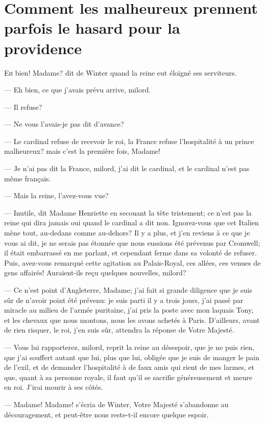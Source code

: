 \chapter[Les malheureux prennent le hasard pour la providence]{Comment les malheureux prennent parfois le hasard pour la providence}

\lettrine[ante=—]{E}{h} bien! Madame? dit de Winter quand la reine eut éloigné ses serviteurs.

\zz
— Eh bien, ce que j'avais prévu arrive, milord.

\zz
— Il refuse?

\zz
— Ne vous l'avais-je pas dit d'avance?

— Le cardinal refuse de recevoir le roi, la France refuse l'hospitalité à un prince malheureux? mais c'est la première fois, Madame!

— Je n'ai pas dit la France, milord, j'ai dit le cardinal, et le cardinal n'est pas même français.

— Mais la reine, l'avez-vous vue?

— Inutile, dit Madame Henriette en secouant la tête tristement; ce n'est pas la reine qui dira jamais oui quand le cardinal a dit non. Ignorez-vous que cet Italien mène tout, au-dedans comme au-dehors? Il y a plus, et j'en reviens à ce que je vous ai dit, je ne serais pas étonnée que nous eussions été prévenus par Cromwell; il était embarrassé en me parlant, et cependant ferme dans sa volonté de refuser. Puis, avez-vous remarqué cette agitation au Palais-Royal, ces allées, ces venues de gens affairés! Auraient-ils reçu quelques nouvelles, milord?

— Ce n'est point d'Angleterre, Madame; j'ai fait si grande diligence que je suis sûr de n'avoir point été prévenu: je suis parti il y a trois jours, j'ai passé par miracle au milieu de l'armée puritaine, j'ai pris la poste avec mon laquais Tony, et les chevaux que nous montons, nous les avons achetés à Paris. D'ailleurs, avant de rien risquer, le roi, j'en suis sûr, attendra la réponse de Votre Majesté.

— Vous lui rapporterez, milord, reprit la reine au désespoir, que je ne puis rien, que j'ai souffert autant que lui, plus que lui, obligée que je suis de manger le pain de l'exil, et de demander l'hospitalité à de faux amis qui rient de mes larmes, et que, quant à sa personne royale, il faut qu'il se sacrifie généreusement et meure en roi. J'irai mourir à ses côtés.


— Madame! Madame! s'écria de Winter, Votre Majesté s'abandonne au découragement, et peut-être nous reste-t-il encore quelque espoir.

